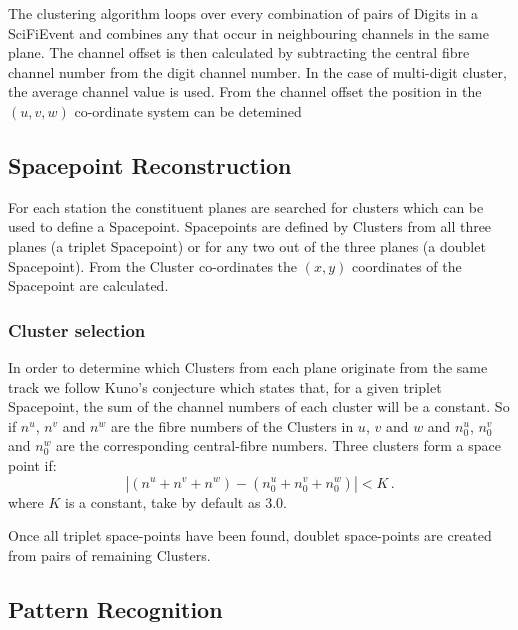   The clustering algorithm loops over every combination of pairs of Digits in a SciFiEvent and combines any that occur in neighbouring channels in the same plane. The channel offset is then calculated by subtracting the central fibre channel number from the digit channel number. In the case of multi-digit cluster, the average channel value is used. From the channel offset the position in the  $(u,v,w)$ co-ordinate system can be detemined

  \subsection{Spacepoint Reconstruction}
  \label{subsec:SpacepointReconstruction}
  For each station the constituent planes are searched for clusters which can be used to define a Spacepoint. Spacepoints are defined by Clusters from all three planes (a triplet Spacepoint) or for any two out of the three planes (a doublet Spacepoint). 
  From the Cluster co-ordinates the $(x, y)$ coordinates of the Spacepoint are calculated.

  \subsubsection{Cluster selection}
  \label{subsubsec:ClusterSelection}
  In order to determine which Clusters from each plane originate from the same track we follow Kuno's conjecture\cite{MiceTrackers} which states that, for a given triplet Spacepoint, the sum of the channel numbers of each cluster will be a constant.  So if $n^u$, $n^v$ and $n^w$ are the fibre numbers of the Clusters in $u$, $v$ and $w$ and $n^u_0$, $n^v_0$ and $n^w_0$ are the corresponding central-fibre numbers. Three clusters form a space point  if:
  \begin{equation}
    | (n^u + n^v + n^w) - (n^u_0 + n^v_0 + n^w_0) | < K \, .
  \end{equation}
  where $K$ is a constant, take by default as 3.0.
  
  Once all triplet space-points have been found, doublet space-points are created from pairs of remaining Clusters. 


  \subsection{Pattern Recognition}
  \label{subsec:PatternRecognition}

